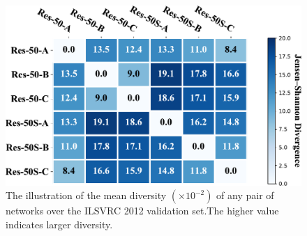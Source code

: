 \documentclass[letterpaper]{article} %
\begin{document}
\begin{figure}[tb]
\begin{center}
\includegraphics[width=0.9\linewidth]{jsd_cropped.pdf}
\end{center}
\caption{The illustration of the mean diversity $(\times 10^{-2})$ of any pair of networks over the ILSVRC 2012 validation set.The higher value indicates larger diversity.}
\label{fig:jsd}
\end{figure}
\end{document}

